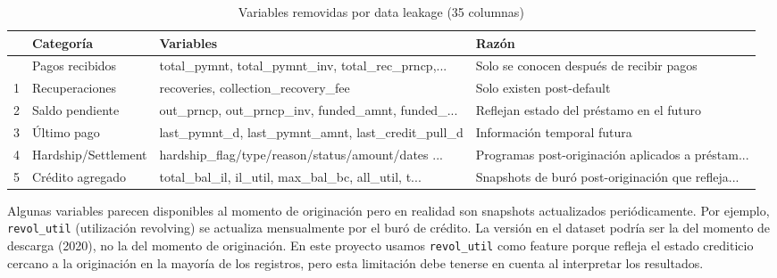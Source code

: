 \documentclass[
  spanish,
  11pt,
  letterpaper,
]{scrbook}
\theoremstyle{plain}
\theoremstyle{remark}
\begin{document}
{

\begin{longtable}[]{@{}llll@{}}

\caption{\label{tbl-leakage-columns}Variables removidas por data leakage
(35 columnas)}

\tabularnewline

\toprule\noalign{}
& Categoría & Variables & Razón \\
\midrule\noalign{}
\endhead
\bottomrule\noalign{}
\endlastfoot
0 & Pagos recibidos & total\_pymnt, total\_pymnt\_inv,
total\_rec\_prncp,... & Solo se conocen después de recibir pagos \\
1 & Recuperaciones & recoveries, collection\_recovery\_fee & Solo
existen post-default \\
2 & Saldo pendiente & out\_prncp, out\_prncp\_inv, funded\_amnt,
funded\_... & Reflejan estado del préstamo en el futuro \\
3 & Último pago & last\_pymnt\_d, last\_pymnt\_amnt,
last\_credit\_pull\_d & Información temporal futura \\
4 & Hardship/Settlement & hardship\_flag/type/reason/status/amount/dates
... & Programas post-originación aplicados a préstam... \\
5 & Crédito agregado & total\_bal\_il, il\_util, max\_bal\_bc,
all\_util, t... & Snapshots de buró post-originación que refleja... \\

\end{longtable}

}

\begin{tcolorbox}[enhanced jigsaw, arc=.35mm, bottomrule=.15mm, bottomtitle=1mm, breakable, colback=white, colbacktitle=quarto-callout-warning-color!10!white, colframe=quarto-callout-warning-color-frame, coltitle=black, left=2mm, leftrule=.75mm, opacityback=0, opacitybacktitle=0.6, rightrule=.15mm, title=\textcolor{quarto-callout-warning-color}{\faExclamationTriangle}\hspace{0.5em}{La trampa del leakage sutil}, titlerule=0mm, toprule=.15mm, toptitle=1mm]

Algunas variables parecen disponibles al momento de originación pero en
realidad son snapshots actualizados periódicamente. Por ejemplo,
\texttt{revol\_util} (utilización revolving) se actualiza mensualmente
por el buró de crédito. La versión en el dataset podría ser la del
momento de descarga (2020), no la del momento de originación. En este
proyecto usamos \texttt{revol\_util} como feature porque refleja el
estado crediticio cercano a la originación en la mayoría de los
registros, pero esta limitación debe tenerse en cuenta al interpretar
los resultados.

\end{tcolorbox}
\end{document}
